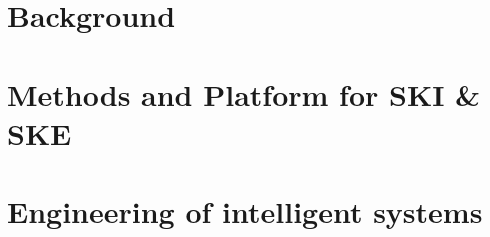 \documentclass[12pt,a4paper,openright,twoside]{book}
\begin{document}
\mainmatter
\glsresetall




\part{Background}
\label{part:background}

\begin{refsection}




\printbibliography[title=References,heading=bibintoc]
\end{refsection}


\part{Methods and Platform for \gls{SKI} \& \gls{SKE}}
\label{part:engineering-of-ski-ske}

\begin{refsection}



\printbibliography[title=References,heading=bibintoc]
\end{refsection}


\part{Engineering of intelligent systems}\label{part:engineering-of-intelligent-systems}

\begin{refsection}



\printbibliography[title=References,heading=bibintoc]
\end{refsection}

\adjustmtc
\end{document}
